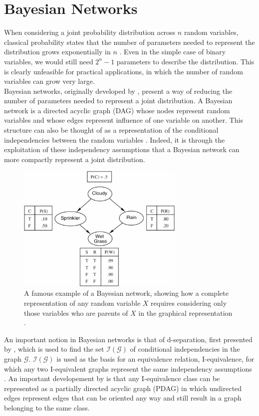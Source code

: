 \documentclass [11pt]{article}
\begin{document}
\section{Bayesian Networks}\label{BayesianNetworks}
When considering a joint probability distribution across $n$ random variables, classical probability states that the number of parameters needed to represent the distribution grows exponentially in $n$ \citep{koller09}. Even in the simple case of binary variables, we would still need $2^n -1$ parameters to describe the distribution. This is clearly unfeasible for practical applications, in which the number of random variables can grow very large. 
\\
Bayesian networks, originally developed by \citet{pearl88}, present a way of reducing the number of parameters needed to represent a joint distribution. A Bayesian network is a directed acyclic graph (DAG) whose nodes represent random variables and whose edges represent influence of one variable on another. This structure can also be thought of as a representation of the conditional independencies between the random variables \citep{koller09}. Indeed, it is through the exploitation of these independency assumptions that a Bayesian network can more compactly represent a joint distribution.
\begin{figure}[H]\label{fig:sprinkler}
\centering
\caption{A famous example of a Bayesian network, showing how a complete representation of any random variable $X$ requires considering only those variables who are parents of $X$ in the graphical representation \citep{norvig94}.}
\includegraphics[width=8cm]{sprinkler.jpg}
\end{figure}
An important notion in Bayesian networks is that of d-separation, first presented by \citet{pearl86}, which is used to find the set $\mathcal{I}(\mathcal{G})$ of conditional independencies in the graph $\mathcal{G}$. $\mathcal{I}(\mathcal{G})$ is used as the basis for an equivalence relation, I-equivalence, for which any two I-equivalent graphs represent the same independency assumptions \citep{verma91}. An important developement by \citet{pearl86} is that any I-equivalence class can be represented as a partially directed acyclic graph (PDAG) in which undirected edges represent edges that can be oriented any way and still result in a graph belonging to the same class.
\end{document}

